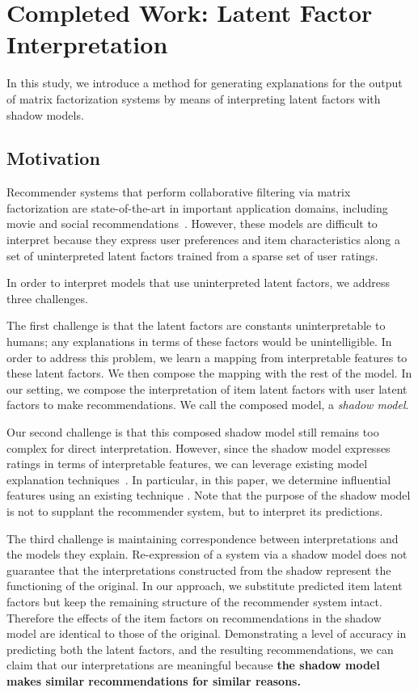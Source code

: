 \chapter{Completed Work: Latent Factor Interpretation}

In this study, we introduce a method for generating explanations for the
output of matrix factorization systems by means of interpreting latent factors
with shadow models.

\section{Motivation}

Recommender systems that perform collaborative filtering via matrix
factorization are state-of-the-art in important application domains,
including movie and social
recommendations~\cite{koren2009matrix,facebook-cf}.
However, these models are difficult to interpret because they express
user preferences and item characteristics along a set of uninterpreted
latent factors trained from a sparse set of user ratings.

In order to interpret models that use uninterpreted latent factors, we
address three challenges.

The first challenge is that the latent factors are constants
uninterpretable to humans; any explanations in terms of these factors
would be unintelligible.
In order to address this problem, we learn a mapping from
interpretable features to these latent factors.
We then compose the mapping with the rest of the model. 
In our setting, we compose the interpretation of item latent factors
with user latent factors to make recommendations. 
We call the composed model, a \emph{shadow model}.

Our second challenge is that this composed shadow model still remains
too complex for direct interpretation.
However, since the shadow model expresses ratings in terms of
interpretable features, we can leverage existing model explanation
techniques~\cite{datta2016algorithmic,ribeiro2016lime}.
In particular, in this paper, we determine influential features using
an existing technique \cite{datta2016algorithmic}.
Note that the purpose of the shadow model is not to supplant the
recommender system, but to interpret its predictions.

The third challenge is maintaining correspondence between
interpretations and the models they explain.
Re-expression of a system via a shadow model does not guarantee that
the interpretations constructed from the shadow represent the
functioning of the original. 
In our approach, we substitute predicted item latent factors but keep
the remaining structure of the recommender system intact. 
Therefore the effects of the item factors on recommendations in the
shadow model are identical to those of the original. 
Demonstrating a level of accuracy in predicting both the latent
factors, and the resulting recommendations, we can claim that our
interpretations are meaningful because \textbf{the shadow model makes
  similar recommendations for similar reasons.}

